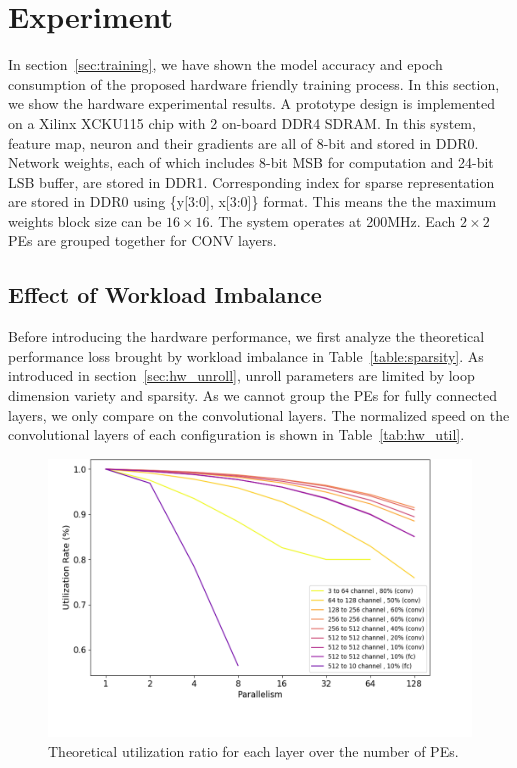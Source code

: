 \section{Experiment}\label{sec:experiment}
In section~\ref{sec:training}, we have shown the model accuracy and epoch consumption of the proposed hardware friendly training process. In this section, we show the hardware experimental results. A prototype design is implemented on a Xilinx XCKU115 chip with 2 on-board DDR4 SDRAM. In this system, feature map, neuron and their gradients are all of 8-bit and stored in DDR0. Network weights, each of which includes 8-bit MSB for computation and 24-bit LSB buffer, are stored in DDR1. Corresponding index for sparse representation are stored in DDR0 using \{y[3:0], x[3:0]\} format. This means the the maximum weights block size can be $16\times 16$. The system operates at 200MHz. Each $2\times 2$ PEs are grouped together for CONV layers.



\subsection{Effect of Workload Imbalance}\label{sec:exp:imb}

Before introducing the hardware performance, we first analyze the theoretical performance loss brought by workload imbalance in Table~\ref{table:sparsity}. As introduced in section~\ref{sec:hw_unroll}, unroll parameters are limited by loop dimension variety and sparsity. As we cannot group the PEs for fully connected layers, we only compare on the convolutional layers. The normalized speed on the convolutional layers of each configuration is shown in Table~\ref{tab:hw_util}.



\begin{figure}[tb]
  \centering
  \includegraphics[width=1.0\columnwidth]{figures/util_real.png}
  \caption{Theoretical utilization ratio for each layer over the number of PEs.}
  \label{fig:util_real}
\end{figure}

